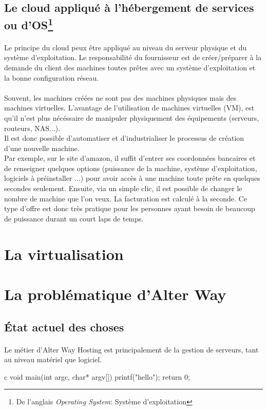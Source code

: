 \subsection{Le cloud appliqué à l'hébergement de services ou d'OS\protect\footnote{De l'anglais \textit{Operating System}: Système d'exploitation}}
\paragraph*{}
Le principe du cloud peux être appliqué au niveau du serveur physique et du système d'exploitation. Le responsabilité du fournisseur est de créer/préparer
à la demande du client des machines toutes prêtes avec un système d'exploitation et la bonne configuration réseau.

\paragraph*{}
Souvent, les machines créées ne sont pas des machines physiques mais des machines virtuelles. L'avantage de l'utilisation de machines virtuelles (VM), est
qu'il n'est plus nécéssaire de manipuler physiquement des équipements (serveurs, routeurs, NAS...).
\\
Il est donc possible d'automatiser et d'industrialiser le processus de création d'une nouvelle machine.
\\
Par exemple, sur le site d'amazon, il suffit d'entrer ses coordonnées bancaires et de renseigner quelques options (puissance de la machine, système d'exploitation, logiciels à préinstaller ...)
 pour avoir accès à une machine toute prête en quelques secondes seulement. Ensuite, via un simple clic, il est possible de changer le nombre de machine que l'on veux.
La facturation est calculé à la seconde. Ce type d'offre est donc très pratique pour les personnes ayant besoin de beaucoup de puissance durant un court laps de temps.


\section{La virtualisation}\label{virtualisation}

\section{La problématique d'Alter Way}
\subsection{État actuel des choses}
\paragraph*{}
Le métier d'Alter Way Hosting est principalement de la gestion de serveurs, tant au niveau matériel que logiciel.


\begin{pygmented}{c}
void main(int argc, char* argv[])
{
	printf("hello");
	return 0;
}
\end{pygmented}

\cite{test}
